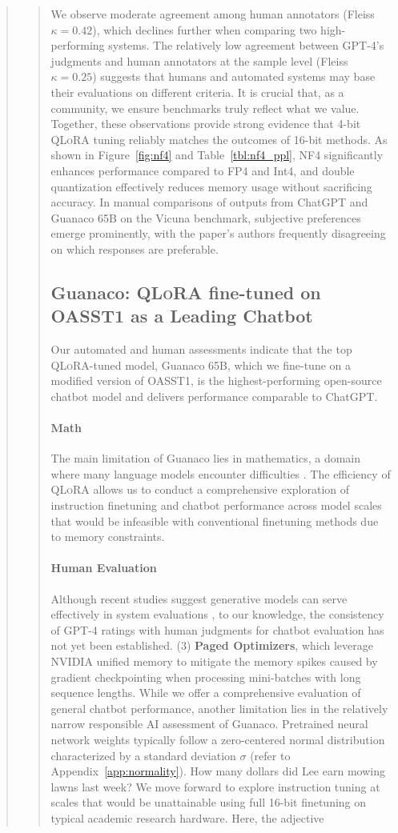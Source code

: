 \begin{quote}
{\begin{abstract}
{We observe moderate agreement among human annotators (Fleiss $\kappa=0.42$), which declines further when comparing two high-performing systems. The relatively low agreement between GPT-4’s judgments and human annotators at the sample level (Fleiss $\kappa=0.25$) suggests that humans and automated systems may base their evaluations on different criteria. It is crucial that, as a community, we ensure benchmarks truly reflect what we value. Together, these observations provide strong evidence that 4-bit \textsc{QLoRA} tuning reliably matches the outcomes of 16-bit methods. As shown in Figure~\ref{fig:nf4} and Table~\ref{tbl:nf4_ppl}, NF4 significantly enhances performance compared to FP4 and Int4, and double quantization effectively reduces memory usage without sacrificing accuracy. In manual comparisons of outputs from ChatGPT and {Guanaco} 65B on the Vicuna benchmark, subjective preferences emerge prominently, with the paper’s authors frequently disagreeing on which responses are preferable. \subsection{\textbf{Guanaco}: \textsc{QLoRA} fine-tuned on OASST1 as a Leading Chatbot} Our automated and human assessments indicate that the top \textsc{QLoRA}-tuned model, {Guanaco} 65B, which we fine-tune on a modified version of OASST1, is the highest-performing open-source chatbot model and delivers performance comparable to ChatGPT. \paragraph{Math} The main limitation of {Guanaco} lies in mathematics, a domain where many language models encounter difficulties \citep{liang2022holistic}. The efficiency of \textsc{QLoRA} allows us to conduct a comprehensive exploration of instruction finetuning and chatbot performance across model scales that would be infeasible with conventional finetuning methods due to memory constraints. \paragraph{Human Evaluation} Although recent studies suggest generative models can serve effectively in system evaluations \citep{fu2023gptscore}, to our knowledge, the consistency of GPT-4 ratings with human judgments for chatbot evaluation has not yet been established. (3) \textbf{Paged Optimizers}, which leverage NVIDIA unified memory to mitigate the memory spikes caused by gradient checkpointing when processing mini-batches with long sequence lengths. While we offer a comprehensive evaluation of general chatbot performance, another limitation lies in the relatively narrow responsible AI assessment of {Guanaco}. Pretrained neural network weights typically follow a zero-centered normal distribution characterized by a standard deviation $\sigma$ (refer to Appendix~\ref{app:normality}). How many dollars did Lee earn mowing lawns last week? We move forward to explore instruction tuning at scales that would be unattainable using full 16-bit finetuning on typical academic research hardware. Here, the adjective }
\end{abstract}}
\end{quote}

